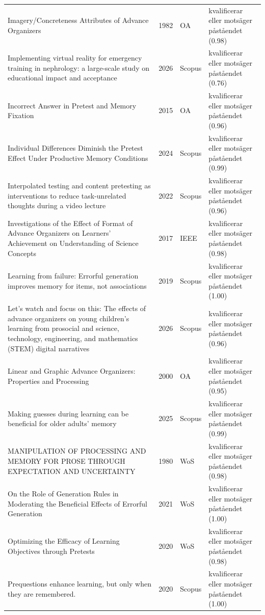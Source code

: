 \begin{longtable}{@{}%
  >{\raggedright\arraybackslash}p{}c%
  >{\raggedright\arraybackslash}p{}%
  >{\raggedright\arraybackslash}p{}@{}}
Imagery/Concreteness Attributes of Advance Organizers & 1982 & OA & kvalificerar eller motsäger påståendet (0.98) \\
Implementing virtual reality for emergency training in nephrology: a large-scale study on educational impact and acceptance & 2026 & Scopus & kvalificerar eller motsäger påståendet (0.76) \\
Incorrect Answer in Pretest and Memory Fixation & 2015 & OA & kvalificerar eller motsäger påståendet (0.96) \\
Individual Differences Diminish the Pretest Effect Under Productive Memory Conditions & 2024 & Scopus & kvalificerar eller motsäger påståendet (0.99) \\
Interpolated testing and content pretesting as interventions to reduce task-unrelated thoughts during a video lecture & 2022 & Scopus & kvalificerar eller motsäger påståendet (0.96) \\
Investigations of the Effect of Format of Advance Organizers on Learners' Achievement on Understanding of Science Concepts & 2017 & IEEE & kvalificerar eller motsäger påståendet (0.98) \\
Learning from failure: Errorful generation improves memory for items, not associations & 2019 & Scopus & kvalificerar eller motsäger påståendet (1.00) \\
Let's watch and focus on this: The effects of advance organizers on young children's learning from prosocial and science, technology, engineering, and mathematics (STEM) digital narratives & 2026 & Scopus & kvalificerar eller motsäger påståendet (0.96) \\
Linear and Graphic Advance Organizers: Properties and Processing & 2000 & OA & kvalificerar eller motsäger påståendet (0.95) \\
Making guesses during learning can be beneficial for older adults' memory & 2025 & Scopus & kvalificerar eller motsäger påståendet (0.99) \\
MANIPULATION OF PROCESSING AND MEMORY FOR PROSE THROUGH EXPECTATION AND UNCERTAINTY & 1980 & WoS & kvalificerar eller motsäger påståendet (0.98) \\
On the Role of Generation Rules in Moderating the Beneficial Effects of Errorful Generation & 2021 & WoS & kvalificerar eller motsäger påståendet (1.00) \\
Optimizing the Efficacy of Learning Objectives through Pretests & 2020 & WoS & kvalificerar eller motsäger påståendet (0.98) \\
Prequestions enhance learning, but only when they are remembered. & 2020 & Scopus & kvalificerar eller motsäger påståendet (1.00) \\

\end{longtable}
